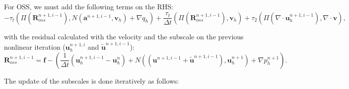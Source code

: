 For OSS, we must add the following terms on the RHS:
$$-\tau_t\left(\Pi(\mathbf{R}_{oss}^{n+1,i-1}),N(\mathbf{a}^{n+1,i-1},\mathbf{v}_h)+\nabla q_h\right)+\frac{\tau_t}{\Delta t}\left(\Pi(\mathbf{R}_{oss}^{n+1,i-1}),\mathbf{v}_h\right)+\tau_2\left(\Pi(\nabla\cdot\mathbf{u}_h^{n+1,i-1}),\nabla\cdot\mathbf{v}\right),$$

with the residual calculated with the velocity and the subscale on the previous nonlinear iteration ($\mathbf{u}_h^{n+1,i}$ and $\tilde{\mathbf{u}}^{n+1,i-1}$): $$\mathbf{R}_{oss}^{n+1,i-1}=\mathbf{f}-\left(\frac{1}{\Delta t}(\mathbf{u}_h^{n+1,i-1}-\mathbf{u}_h^{n})+N((\mathbf{u}^{n+1,i-1}+\tilde{\mathbf{u}}^{n+1,i-1}),\mathbf{u}_h^{n+1})+\nabla p_h^{n+1}\right).$$

The update of the subscales is done iteratively as follows:

